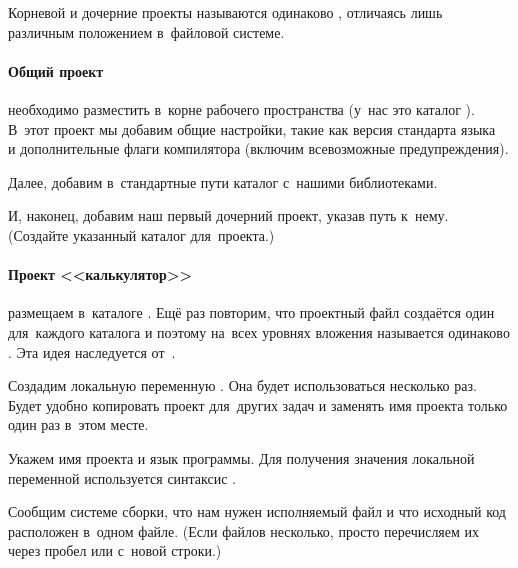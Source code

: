 Корневой и дочерние проекты  называются одинаково , отличаясь лишь различным положением в~файловой системе.



\paragraph{Общий проект}
необходимо разместить в~корне рабочего пространства (у~нас это каталог ). В~этот проект мы добавим общие настройки, такие как версия стандарта языка~ и дополнительные флаги компилятора (включим всевозможные предупреждения).


Далее, добавим в~стандартные пути каталог с~нашими библиотеками.


И, наконец, добавим наш первый дочерний проект, указав путь к~нему. (Создайте указанный каталог для~проекта.)




\paragraph{Проект <<калькулятор>>}
размещаем в~каталоге . Ещё раз повторим, что проектный файл создаётся один для~каждого каталога и поэтому на~всех уровнях вложения называется одинаково . Эта идея наследуется от~.

Создадим локальную переменную . Она будет использоваться несколько раз. Будет удобно копировать проект для~других задач и заменять имя проекта только один раз в~этом месте.


Укажем имя проекта и язык программы. Для получения значения локальной переменной используется синтаксис .


Сообщим системе сборки, что нам нужен исполняемый файл и что исходный код расположен в~одном файле. (Если файлов несколько, просто перечисляем их через пробел или с~новой строки.)

